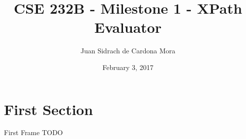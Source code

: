 \documentclass{beamer}
\title{CSE 232B - Milestone 1 - XPath Evaluator}
\date{February 3, 2017}
\author{Juan Sidrach de Cardona Mora}
\institute{University of California, San Diego}
\begin{document}
  \maketitle
  \section{First Section}
  \begin{frame}{First Frame}
    TODO
  \end{frame}
\end{document}
